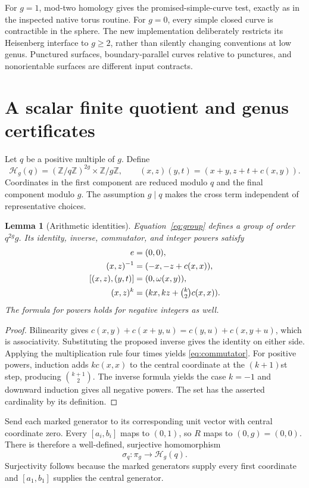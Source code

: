 \documentclass[11pt,letterpaper]{article}
\newtheorem{lemma}[lemma]{Lemma}
\theoremstyle{definition}
\theoremstyle{remark}
\newcommand{\Z}{\mathbb Z}
\newcommand{\HH}{\mathcal H}
\newcommand{\sig}{\sigma}
\begin{document}
For $g=1$, mod-two homology gives the promised-simple-curve test, exactly as in the inspected native torus routine. For $g=0$, every simple closed curve is contractible in the sphere. The new implementation deliberately restricts its Heisenberg interface to $g\ge2$, rather than silently changing conventions at low genus. Punctured surfaces, boundary-parallel curves relative to punctures, and nonorientable surfaces are different input contracts.

\section{A scalar finite quotient and genus certificates}
\label{sec:scalar}
Let $q$ be a positive multiple of $g$. Define
\begin{equation}\label{eq:group}
 \HH_g(q)=(\Z/q\Z)^{2g}\times\Z/g\Z,
 \qquad (x,z)(y,t)=(x+y,z+t+c(x,y)).
\end{equation}
Coordinates in the first component are reduced modulo $q$ and the final component modulo $g$. The assumption $g\mid q$ makes the cross term independent of representative choices.

\begin{lemma}[Arithmetic identities]\label{lem:group}
Equation~\eqref{eq:group} defines a group of order $q^{2g}g$. Its identity, inverse, commutator, and integer powers satisfy
\begin{align}
 e&=(0,0),\\
 (x,z)^{-1}&=(-x,-z+c(x,x)),\\
 [(x,z),(y,t)]&=(0,\omega(x,y)),\label{eq:commutator}\\
 (x,z)^k&=(kx,kz+\tbinom{k}{2}c(x,x)).\label{eq:power}
\end{align}
The formula for powers holds for negative integers as well.
\end{lemma}
\begin{proof}
Bilinearity gives
$c(x,y)+c(x+y,u)=c(y,u)+c(x,y+u)$, which is associativity. Substituting the proposed inverse gives the identity on either side. Applying the multiplication rule four times yields \eqref{eq:commutator}. For positive powers, induction adds $kc(x,x)$ to the central coordinate at the $(k+1)$st step, producing $\binom{k+1}{2}$. The inverse formula yields the case $k=-1$ and downward induction gives all negative powers. The set has the asserted cardinality by its definition.
\end{proof}

Send each marked generator to its corresponding unit vector with central coordinate zero. Every $[a_i,b_i]$ maps to $(0,1)$, so $R$ maps to $(0,g)=(0,0)$. There is therefore a well-defined, surjective homomorphism
\[
 \sig_q:\pi_g\longrightarrow\HH_g(q).
\]
Surjectivity follows because the marked generators supply every first coordinate and $[a_1,b_1]$ supplies the central generator.
\end{document}
